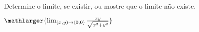 Determine o limite, se existir, ou mostre que o limite não existe.

\item$\mathlarger{\lim_{(x,y)\rightarrow(0,0)} \frac{xy}{\sqrt{x^2+y^2}}}$